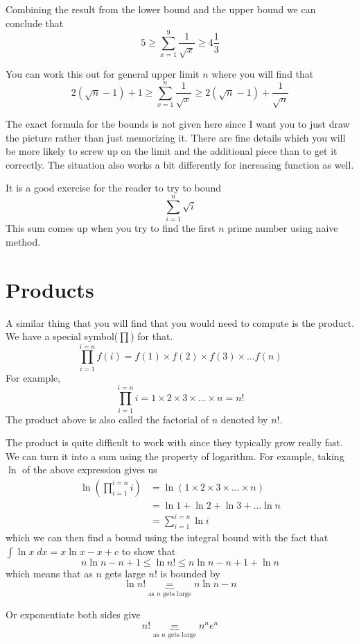 \documentclass[a4paper, 12pt]{article}
\begin{document}
\begin{multicols}{2}
Combining the result from the lower bound and the upper bound we can conclude that
\[
 5 \ge \sum_{x=1}^{9} \frac{1}{\sqrt{x}} \ge 4\frac{1}{3}
\]

You can work this out for general upper limit $n$ where you will find that
\[
	2 \left( \sqrt{n} - 1 \right )+ 1 \ge \sum_{x=1}^{n} \frac{1}{\sqrt{x}} \ge 2 \left( \sqrt{n} -1  \right )+ \frac{1}{\sqrt{n}}
\]

The exact formula for the bounds is not given here since I want you to just draw the picture rather than just memorizing it. There are fine details which you will be more likely to screw up on the limit and the additional piece than to get it correctly. The situation also works a bit differently for increasing function as well.

It is a good exercise for the reader to try to bound
\[
	\sum_{i=1}^{n} \sqrt{i} 
\]
This sum comes up when you try to find the first $n$ prime number using naive method.

\section*{Products}
A similar thing that you will find that you would need to compute is the product. We have a special symbol($\prod$) for that.
\[
	\prod_{i=1}^{i=n} f(i) = f(1)\times f(2)\times f(3)\times \ldots f(n)
\]
For example,
\[
\prod_{i=1}^{i=n} i = 1 \times  2 \times 3 \times \ldots \times n = n!
\]
The product above is also called the factorial of $n$ denoted by $n!$.

The product is quite difficult to work with since they typically grow really fast. We can turn it into a sum using the property of logarithm. For example, taking $\ln$ of the above expression gives us
\begin{align*}
	\ln(\prod_{i=1}^{i=n} i) &= \ln(1 \times  2 \times 3 \times \ldots \times n)\\
	&= \ln 1 + \ln 2 + \ln 3 + \ldots \ln n\\
	&= \sum_{i=1}^{i=n} \ln i
\end{align*}
which we can then find a bound using the integral bound with the fact that $\int \ln x\; dx = x\ln x -x +c $ to show that
\[
	n\ln n -n +1 \le \ln n!  \le n \ln n  -n + 1 + \ln n
\]
which means that as $n$ gets large $n!$ is bounded by
\[
	\ln n! \underbrace{=}_{\text{as $n$ gets large}} n\ln n - n
\]

Or exponentiate both sides give
\[
	n! \underbrace{=}_{\text{as $n$ gets large}} n^n e^n
\]



\end{multicols}
\end{document}

